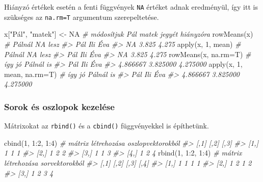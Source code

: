 \documentclass[
]{book}
\newenvironment{Shaded}{\begin{snugshade}}{\end{snugshade}}
\newcommand{\AttributeTok}[1]{\textcolor[rgb]{0.77,0.63,0.00}{#1}}
\newcommand{\CommentTok}[1]{\textcolor[rgb]{0.56,0.35,0.01}{\textit{#1}}}
\newcommand{\ConstantTok}[1]{\textcolor[rgb]{0.00,0.00,0.00}{#1}}
\newcommand{\DecValTok}[1]{\textcolor[rgb]{0.00,0.00,0.81}{#1}}
\newcommand{\FunctionTok}[1]{\textcolor[rgb]{0.00,0.00,0.00}{#1}}
\newcommand{\NormalTok}[1]{#1}
\newcommand{\OtherTok}[1]{\textcolor[rgb]{0.56,0.35,0.01}{#1}}
\newcommand{\SpecialCharTok}[1]{\textcolor[rgb]{0.00,0.00,0.00}{#1}}
\newcommand{\StringTok}[1]{\textcolor[rgb]{0.31,0.60,0.02}{#1}}
\begin{document}
Hiányzó értékek esetén a fenti függvények \texttt{NA} értéket adnak eredményül, így itt is szükséges az \texttt{na.rm=T} argumentum szerepeltetése.

\begin{Shaded}
\begin{Highlighting}[]
\NormalTok{x[}\StringTok{"Pál"}\NormalTok{, }\StringTok{"matek"}\NormalTok{] }\OtherTok{\textless{}{-}} \ConstantTok{NA}     \CommentTok{\# módosítjuk Pál matek jegyét hiányzóra}
\FunctionTok{rowMeans}\NormalTok{(x)                 }\CommentTok{\# Pálnál NA lesz   }
\CommentTok{\#\textgreater{}   Pál   Ili   Éva }
\CommentTok{\#\textgreater{}    NA 3.825 4.275}
\FunctionTok{apply}\NormalTok{(x, }\DecValTok{1}\NormalTok{, mean)           }\CommentTok{\# Pálnál NA lesz   }
\CommentTok{\#\textgreater{}   Pál   Ili   Éva }
\CommentTok{\#\textgreater{}    NA 3.825 4.275}
\FunctionTok{rowMeans}\NormalTok{(x, }\AttributeTok{na.rm=}\NormalTok{T)        }\CommentTok{\# így jó Pálnál is   }
\CommentTok{\#\textgreater{}      Pál      Ili      Éva }
\CommentTok{\#\textgreater{} 4.866667 3.825000 4.275000}
\FunctionTok{apply}\NormalTok{(x, }\DecValTok{1}\NormalTok{, mean, }\AttributeTok{na.rm=}\NormalTok{T)  }\CommentTok{\# így jó Pálnál is}
\CommentTok{\#\textgreater{}      Pál      Ili      Éva }
\CommentTok{\#\textgreater{} 4.866667 3.825000 4.275000}
\end{Highlighting}
\end{Shaded}

\hypertarget{sorok-uxe9s-oszlopok-kezeluxe9se}{%
\subsubsection{Sorok és oszlopok kezelése}\label{sorok-uxe9s-oszlopok-kezeluxe9se}}

Mátrixokat az \texttt{rbind()} és a \texttt{cbind()} függvényekkel is építhetünk.

\begin{Shaded}
\begin{Highlighting}[]
\FunctionTok{cbind}\NormalTok{(}\DecValTok{1}\NormalTok{, }\DecValTok{1}\SpecialCharTok{:}\DecValTok{2}\NormalTok{, }\DecValTok{1}\SpecialCharTok{:}\DecValTok{4}\NormalTok{)    }\CommentTok{\# mátrix létrehozása oszlopvektorokból}
\CommentTok{\#\textgreater{}      [,1] [,2] [,3]}
\CommentTok{\#\textgreater{} [1,]    1    1    1}
\CommentTok{\#\textgreater{} [2,]    1    2    2}
\CommentTok{\#\textgreater{} [3,]    1    1    3}
\CommentTok{\#\textgreater{} [4,]    1    2    4}
\FunctionTok{rbind}\NormalTok{(}\DecValTok{1}\NormalTok{, }\DecValTok{1}\SpecialCharTok{:}\DecValTok{2}\NormalTok{, }\DecValTok{1}\SpecialCharTok{:}\DecValTok{4}\NormalTok{)    }\CommentTok{\# mátrix létrehozása sorvektorokból}
\CommentTok{\#\textgreater{}      [,1] [,2] [,3] [,4]}
\CommentTok{\#\textgreater{} [1,]    1    1    1    1}
\CommentTok{\#\textgreater{} [2,]    1    2    1    2}
\CommentTok{\#\textgreater{} [3,]    1    2    3    4}
\end{Highlighting}
\end{Shaded}
\end{document}
